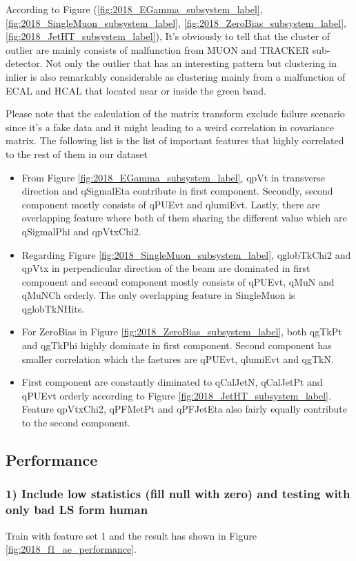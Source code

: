 According to Figure (\ref{fig:2018_EGamma_subsystem_label}, \ref{fig:2018_SingleMuon_subsystem_label}, \ref{fig:2018_ZeroBias_subsystem_label}, \ref{fig:2018_JetHT_subsystem_label}), It's obviously to tell that the cluster of outlier are mainly consists of malfunction from MUON and TRACKER sub-detector. Not only the outlier that has an interesting pattern but clustering in inlier is also remarkably considerable as clustering mainly from a malfunction of ECAL and HCAL that located near or inside the green band.

Please note that the calculation of the matrix transform exclude failure scenario since it's a fake data and it might leading to a weird correlation in covariance matrix.
The following list is the list of important features that highly correlated to the rest of them in our dataset
\begin{itemize}
    \item From Figure \ref{fig:2018_EGamma_subsystem_label}, qpVt in transverse direction and qSigmalEta contribute in first component.
    Secondly, second component mostly consists of qPUEvt and qlumiEvt. Lastly, there are overlapping feature where both of them sharing the different value which are qSigmalPhi and qpVtxChi2.
    \item Regarding Figure \ref{fig:2018_SingleMuon_subsystem_label}, qglobTkChi2 and qpVtx in perpendicular direction of the beam are dominated in first component and second component mostly consists of qPUEvt, qMuN and qMuNCh orderly.
    The only overlapping feature in SingleMuon is qglobTkNHits.
    \item For ZeroBias in Figure \ref{fig:2018_ZeroBias_subsystem_label}, both qgTkPt and qgTkPhi highly dominate in first component.
    Second component has smaller correlation which the faetures are qPUEvt, qlumiEvt and qgTkN.
    \item First component are constantly diminated to qCalJetN, qCalJetPt and qPUEvt orderly according to Figure \ref{fig:2018_JetHT_subsystem_label}.
    Feature qpVtxChi2, qPFMetPt and qPFJetEta also fairly equally contribute to the second component. 
\end{itemize}

\subsection{Performance}
\subsubsection{1) Include low statistics (fill null with zero) and testing with only bad LS form human}
Train with feature set 1 and the result has shown in Figure \ref{fig:2018_f1_ae_performance}.

